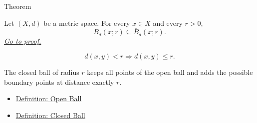 \begin{theorembox}{Theorem}
\begin{theorem}
\label{thm:metric-closed-balls-contain-open-balls}
Let \((X,d)\) be a metric space.  For every \(x
\in X\) and every \(r>0\),
\[
  B_d(x;r)\subseteq \overline{B}_d(x;r).
\]
\hyperref[prf:metric-closed-balls-contain-open-balls]{\textit{Go to proof.}}
\end{theorem}
\end{theorembox}

\begin{remark*}
\[
d(x,y)<r
\Longrightarrow
d(x,y)\leq r.
\]
\end{remark*}

\begin{remark*}[Interpretation]
The closed ball of radius \(r\) keeps all points of the open ball and adds
the possible boundary points at distance exactly \(r\).
\end{remark*}

\begin{dependencies}
\begin{itemize}
  \item \hyperref[def:metric-open-ball]{Definition: Open Ball}
  \item \hyperref[def:metric-closed-ball]{Definition: Closed Ball}
\end{itemize}
\end{dependencies}
